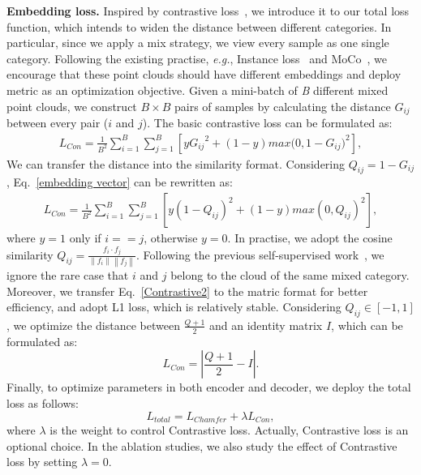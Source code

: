 \documentclass[journal]{IEEEtran}
\def\eg{\emph{e.g.}}
\begin{document}
\textbf{Embedding loss.} Inspired by contrastive loss~\cite{2006Dimensionality}, we introduce it to our total loss function, which intends to widen the distance between different categories.
In particular, since we apply a mix strategy, we view every sample as one single category. 
Following the existing practise, \eg, Instance loss~\cite{zheng2017dual} and MoCo~\cite{he2020momentum}, we encourage that these point clouds should have different embeddings and deploy metric as an optimization objective.
Given a mini-batch of \textit{B} different mixed point clouds, we construct $B\times B$ pairs of samples by calculating the distance $G_{ij}$ between every pair ($i$ and $j$). The basic contrastive loss can be formulated as:
{
\small
\begin{equation}
        \begin{aligned}
            L_{Con} =  \frac{1}{B^2} \sum_{i=1}^{B} \sum_{j=1}^{B} [y{G_{ij}}^2 + (1-y)max(0,{ 1-G_{ij})}^2],
        \end{aligned}
        \label{embedding vector}
\end{equation}
}
We can transfer the distance into the similarity format. Considering $Q_{ij}=1-G_{ij}$, Eq.~\ref{embedding vector} can be rewritten as: 
{\small
    \begin{equation}
        \begin{aligned}
            L_{Con} = \frac{1}{B^2} \sum_{i=1}^{B} \sum_{j=1}^{B} [y{(1-Q_{ij})}^2 + (1-y)
             {max(0,Q_{ij})}^2] ,
        \end{aligned}
        \label{Contrastive2}
    \end{equation}
    }
\noindent where $y=1$ only if $i==j$, otherwise $y=0$. In practise, we adopt the cosine similarity ${Q_{ij}=\frac{f_i \cdot f_j}{\left\|f_i\right\| \left\|f_j\right\|}}$. Following the previous self-supervised work~\cite{he2020momentum}, we ignore the rare case that $i$ and $j$ belong to the cloud of the same mixed category.
Moreover, we transfer Eq.~\ref{Contrastive2} to the matric format for better efficiency, and adopt L1 loss, which is relatively stable. Considering $Q_{ij} \in [-1,1]$, we optimize the distance between $\frac{Q+1}{2}$ and an identity matrix $I$, which can be formulated as: 
    {\setlength\abovedisplayskip{0.15cm}
     \setlength\belowdisplayskip{0.15cm}
    \begin{equation}
        L_{Con} = |\frac{Q+1}{2}-I|.
        \label{Contrastive loss}
    \end{equation}
    }
Finally, to optimize parameters in both encoder and decoder, we deploy the total loss as follows:
{\setlength\abovedisplayskip{0.15cm}
     \setlength\belowdisplayskip{0.15cm}
    \begin{equation}
        L_{total} = L_{Chamfer} + \lambda L_{Con},  \label{total loss}
    \end{equation}
}
where $\lambda$ is the weight to control Contrastive loss. Actually, Contrastive loss is an optional choice. In the ablation studies, we also study the effect of Contrastive loss by setting $\lambda=0$. 
\end{document}
